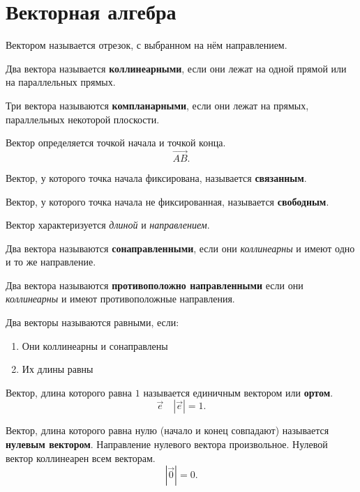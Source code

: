 \section{Векторная алгебра}

\begin{definition}
  Вектором называется отрезок, с выбранном на нём направлением.
\end{definition}

\begin{definition}
  Два вектора называется \textbf{коллинеарными}, если они лежат на одной прямой или на параллельных прямых.
\end{definition}

\begin{definition}
Три вектора называются \textbf{компланарными}, если они лежат на прямых, параллельных некоторой плоскости.
\end{definition}

\begin{definition}
  Вектор определяется точкой начала и точкой конца.
  \[
    \overrightarrow{AB}
  .\] 
\end{definition}

Вектор, у которого точка начала фиксирована, называется \textbf{связанным}.

Вектор, у которого точка начала не фиксированная, называется \textbf{свободным}.

Вектор характеризуется \textit{длиной} и \textit{направлением}.

Два вектора называются \textbf{сонаправленными}, если они \textit{коллинеарны} и имеют одно и то же направление.

Два вектора называются \textbf{противоположно направленными} если они \textit{коллинеарны} и имеют противоположные направления.

Два векторы называются равными, если:
\begin{enumerate}
  \item Они коллинеарны и сонаправлены
  \item Их длины равны
\end{enumerate}

\begin{definition}
  Вектор, длина которого равна $1$ называется единичным вектором или \textbf{ортом}.
  \[
    \vec{e} \quad |\vec{e}| = 1 
  .\] 
\end{definition}

\begin{definition}
  Вектор, длина которого равна нулю (начало и конец совпадают) называется \textbf{нулевым вектором}. Направление нулевого вектора произвольное. Нулевой вектор коллинеарен всем векторам.
  \[
    |\vec{0}| = 0
  .\] 
\end{definition}

